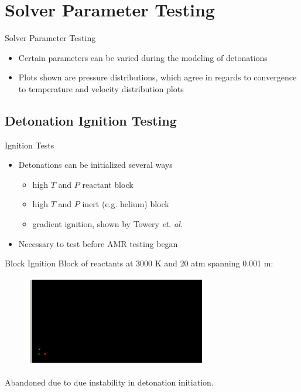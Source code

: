 \section{Solver Parameter Testing}

\begin{frame}{Solver Parameter Testing}
\begin{itemize}
\item Certain parameters can be varied during the modeling of detonations 
\item Plots shown are pressure distributions, which agree in regards to convergence to temperature and velocity distribution plots
\end{itemize}
\end{frame}

\subsection{Detonation Ignition Testing}

\begin{frame}{Ignition Tests}
\begin{itemize}
\item Detonations can be initialized several ways
\begin{itemize}
    \item high $T$ and $P$ reactant block
    \item high $T$ and $P$ inert (e.g. helium) block
    \item gradient ignition, shown by Towery \textit{et. al.} \cite{towery2}
\end{itemize}
\item Necessary to test before AMR testing began 
\end{itemize}    
\end{frame}

\begin{frame}{Block Ignition}
Block of reactants at 3000 K and 20 atm spanning 0.001 m:
\begin{figure}[]
\centering
\includegraphics[width=0.7\textwidth]{../figs/ignition/block.png}
\end{figure}%
Abandoned due to due instability in detonation initiation.
\end{frame}

